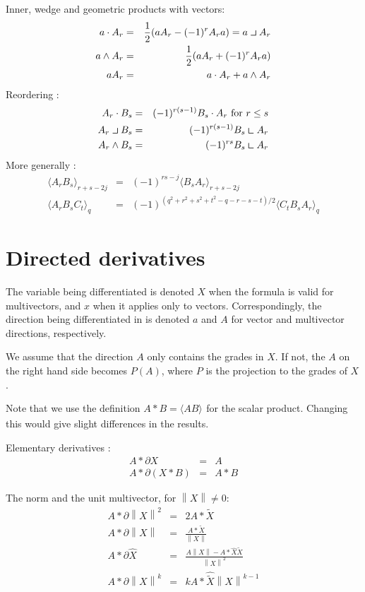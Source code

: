 \documentclass[a4paper,12pt]{article}
\newcommand{\grade}[2]{\ensuremath{\langle#2\rangle_{#1}}}
\newcommand{\reverse}[1]{\tilde{#1}} %
\newcommand{\linner}{\mathbin{\ensuremath{\scalebox{1.4}{$\lrcorner$}}}}
\newcommand{\rinner}{\mathbin{\ensuremath{\scalebox{1.4}{$\llcorner$}}}}
\providecommand{\norm}[1]{\left\lVert#1\right\rVert}
\providecommand{\normed}[1]{\hat{#1}}
\begin{document}
Inner, wedge and geometric products with vectors\cite{CA2GC}:
\begin{eqnarray}
a\cdot A_r &=& \frac{1}{2}(a A_r - (-1)^r A_r a) = a\linner A_r\\
a\wedge A_r &=& \frac{1}{2}(a A_r + (-1)^r A_r a)\\
a A_r &=& a \cdot A_r + a \wedge A_r
\end{eqnarray}
Reordering \cite{CA2GC, Chisolm:2012aa}:
\begin{eqnarray}
 A_r\cdot B_s &=& (-1)^{r(s-1)} B_s \cdot A_r\ \textrm{for}\ r \leq s\\
 A_r\linner B_s &=& (-1)^{r(s-1)} B_s \rinner A_r\\
 A_r\wedge B_s &=& (-1)^{rs} B_s \rinner A_r\\
\end{eqnarray}
More generally \cite{CA2GC, Chisolm:2012aa}:
\begin{eqnarray}
 \grade{r+s-2j}{A_r B_s} &=& (-1)^{rs - j} \grade{r + s - 2j}{B_s A_r}\\
 \grade{q}{A_r B_s C_t} &=& (-1)^{(q^2 + r^2 + s^2 + t^2 - q - r - s - t)/2} \grade{q}{C_t B_s A_r}
\end{eqnarray}
\section{Directed derivatives}

The variable being differentiated is denoted $X$ when the formula is valid for multivectors, and $x$ when it applies only to vectors. Correspondingly, the direction being differentiated in is denoted $a$ and $A$ for vector and multivector directions, respectively.

We assume that the direction $A$ only contains the grades in $X$. If not, the $A$ on the right hand side becomes $P(A)$, where $P$ is the projection to the grades of $X$.

Note that we use the definition $A * B = \grade{}{A B}$ for the scalar product. Changing this would give slight differences in the results.

Elementary derivatives \cite{HitzerCalculus}:
\begin{eqnarray}
A * \partial  X &=& A\\
A * \partial (X * B)  &=&  A * B
\end{eqnarray}

The norm and the unit multivector, for $\norm{X} \neq 0$:
\begin{eqnarray}
A * \partial \norm{X}^2 &=& 2 A * \reverse{X}\\
A * \partial \norm{X} &=& \frac{A * \reverse{X}}{\norm{X}}\\
A * \partial \normed{X} &=& \frac{A \norm{X} - A * \normed{X} \reverse{X}}{\norm{X}^2}\\
A * \partial \norm{X}^k &=& k A * \normed{\reverse{X}} \norm{X}^{k-1}
\end{eqnarray}
\end{document}
